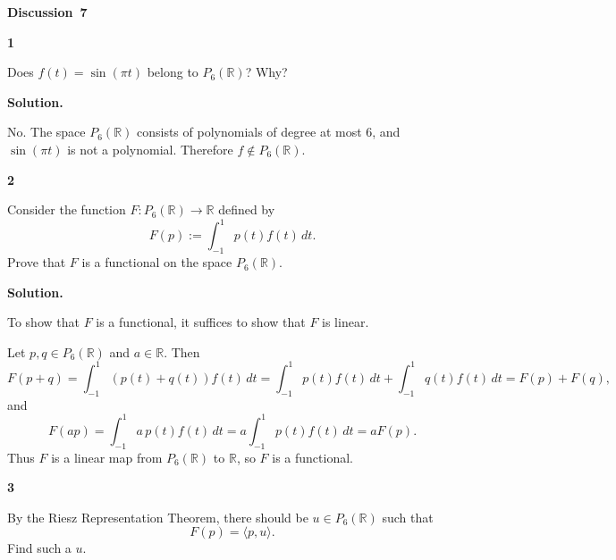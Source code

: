 \documentclass[11pt]{article}
\newcommand{\AssignmentType}{Discussion}
\newcommand{\AssignmentNumber}{7}
\newcommand{\ProblemDivider}[1]{%
  \vspace{1.0em}
  \noindent\textbf{#1}\par
  \vspace{0.35em}
}
\newcommand{\ProblemAnnounce}{\noindent}
\newcommand{\SolutionAnnounce}{\noindent\textbf{Solution.}\par\medskip}
\newcommand{\R}{\mathbb{R}}
\begin{document}
\begin{center}
  {\Large \textbf{\AssignmentType~\AssignmentNumber}}
\end{center}
\vspace{0.75em}

\ProblemDivider{1}
\begin{problemBox}
\ProblemAnnounce
Does $f(t)=\sin(\pi t)$ belong to $P_6(\R)$? Why?
\end{problemBox}

\begin{solutionBox}
\SolutionAnnounce
\doublespacing
No. The space $P_6(\R)$ consists of polynomials of degree at most $6$, and $\sin(\pi t)$ is not a polynomial. Therefore $f \notin P_6(\R)$.
\end{solutionBox}

\ProblemDivider{2}
\begin{problemBox}
\ProblemAnnounce
Consider the function $F:P_6(\R)\to\R$ defined by
\[
F(p):=\int_{-1}^{1} p(t)f(t)\,dt.
\]
Prove that $F$ is a functional on the space $P_6(\R)$.
\end{problemBox}

\begin{solutionBox}
\SolutionAnnounce
\doublespacing
To show that $F$ is a functional, it suffices to show that $F$ is linear.

Let $p,q\in P_6(\R)$ and $a\in\R$. Then
\[
F(p+q)=\int_{-1}^{1} (p(t)+q(t))f(t)\,dt
=\int_{-1}^{1} p(t)f(t)\,dt+\int_{-1}^{1} q(t)f(t)\,dt
=F(p)+F(q),
\]
and
\[
F(ap)=\int_{-1}^{1} a\,p(t)f(t)\,dt
=a\int_{-1}^{1} p(t)f(t)\,dt
=aF(p).
\]
Thus $F$ is a linear map from $P_6(\R)$ to $\R$, so $F$ is a functional.
\end{solutionBox}

\newpage
\ProblemDivider{3}
\begin{problemBox}
\ProblemAnnounce
By the Riesz Representation Theorem, there should be $u\in P_6(\R)$ such that
\[
F(p)=\langle p,u\rangle.
\]
Find such a $u$.
\end{problemBox}
\end{document}
